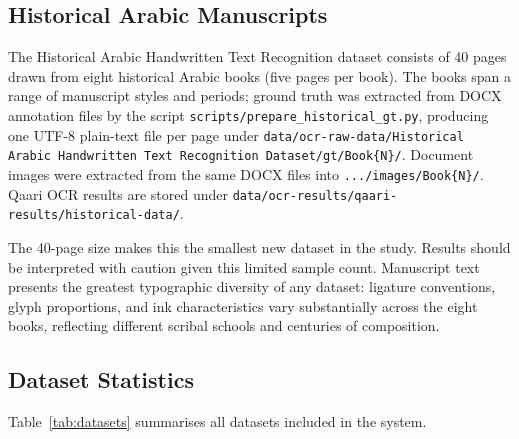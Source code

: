 \subsection{Historical Arabic Manuscripts}
\label{subsec:historical}

The Historical Arabic Handwritten Text Recognition dataset consists of
40 pages drawn from eight historical Arabic books (five pages per book).
The books span a range of manuscript styles and periods; ground truth was
extracted from DOCX annotation files by the script
\texttt{scripts/prepare\_historical\_gt.py}, producing one UTF-8 plain-text
file per page under
\texttt{data/ocr-raw-data/Historical\,Arabic\,Handwritten\,Text\,Recognition\,Dataset/gt/Book\{N\}/}.
Document images were extracted from the same DOCX files into
\texttt{.../images/Book\{N\}/}.
Qaari OCR results are stored under
\texttt{data/ocr-results/qaari-results/historical-data/}.

The 40-page size makes this the smallest new dataset in the study.
Results should be interpreted with caution given this limited sample count.
Manuscript text presents the greatest typographic diversity of any dataset:
ligature conventions, glyph proportions, and ink characteristics vary
substantially across the eight books, reflecting different scribal schools
and centuries of composition.

\subsection{Dataset Statistics}
\label{subsec:dataset_stats}

Table~\ref{tab:datasets} summarises all datasets included in the system.

